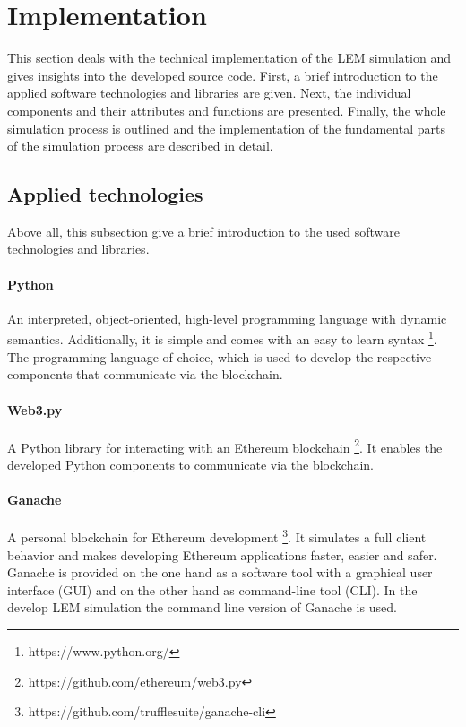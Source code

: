 \section{Implementation}
\label{sec:implementation}

This section deals with the technical implementation of the LEM simulation
and gives insights into the developed source code.
First, a brief introduction to the applied software 
technologies and libraries are given.
Next, the individual components and their attributes and functions are presented. 
Finally, the whole simulation process is outlined and the implementation 
of the fundamental parts of the simulation process are described in detail. 

\subsection{Applied technologies}
\label{sec:applied_technologies}
Above all, this subsection give a brief introduction 
to the used software technologies and libraries.

\paragraph{Python}
An interpreted, object-oriented, high-level programming language with dynamic semantics. Additionally, it is simple and comes with an easy to learn syntax \footnote{https://www.python.org/}.
The programming language of choice, which is used to develop the 
respective components that communicate via the blockchain.

\paragraph{Web3.py}
A Python library for interacting with an Ethereum blockchain \footnote{https://github.com/ethereum/web3.py}. 
It enables the developed Python components to communicate via the blockchain.

\paragraph{Ganache}
A personal blockchain for Ethereum development \footnote{https://github.com/trufflesuite/ganache-cli}.
It simulates a full client behavior and makes developing Ethereum applications faster, easier and safer.
Ganache is provided on the one hand as a software tool with a graphical user interface (GUI) and on the other hand as command-line tool (CLI). In the develop LEM simulation the command line version of Ganache is used. 

